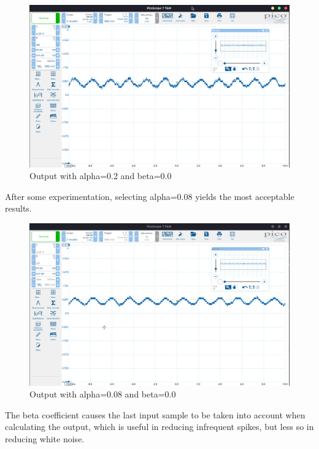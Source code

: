 \begin{figure}[H]
    \centering
    \includegraphics[width=150mm, keepaspectratio]{figures/alpha02.png}
    \caption{Output with alpha=0.2 and beta=0.0}
    \label{fig:alpha02}
\end{figure}

After some experimentation, selecting alpha=0.08 yields the most acceptable results.

\begin{figure}[H]
    \centering
    \includegraphics[width=150mm, keepaspectratio]{figures/alphaok.png}
    \caption{Output with alpha=0.08 and beta=0.0}
    \label{fig:alphaok}
\end{figure}

The beta coefficient causes the last input sample to be taken into account when calculating the output, which is useful in reducing infrequent spikes, but less so in reducing white noise.

